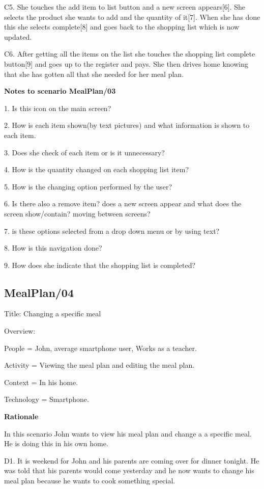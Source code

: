 	C5. She touches the add item to list button and a new screen appears[6]. She selects the product she wants to add and the quantity of it[7]. When she has done this she selects complete[8] and goes back to the shopping list which is now updated.
	
	C6. After getting all the items on the list she touches the shopping list complete button[9] and goes up to the register and pays. She then drives home knowing that she has gotten all that she needed for her meal plan.    
	
\textbf{Notes to scenario MealPlan/03}

1. Is this icon on the main screen?

2. How is each item shown(by text pictures) and what information is shown to each item.

3. Does she check of each item or is it unnecessary?

4. How is the quantity changed on each shopping list item?  

5. How is the changing option performed by the user?

6. Is there also a remove item? does a new screen appear and what does the screen show/contain? moving between screens?

7. is these options selected from a drop down menu or by using text?

8. How is this navigation done?

9. How does she indicate that the shopping list is completed?

\subsection{MealPlan/04} \label{MealPlan04}

Title: Changing a specific meal

Overview:
	
	People = John, average smartphone user, Works as a teacher.
	
	Activity = Viewing the meal plan and editing the meal plan.
	
	Context = In his home. 
	
	Technology = Smartphone.
	
\textbf{Rationale}

In this scenario John wants to view his meal plan and change a a specific meal. He is doing this in his own home.

	D1. It is weekend for John and his parents are coming over for dinner tonight. He was told that his parents would come yesterday and he now wants to change his meal plan because he wants to cook something special.
	
